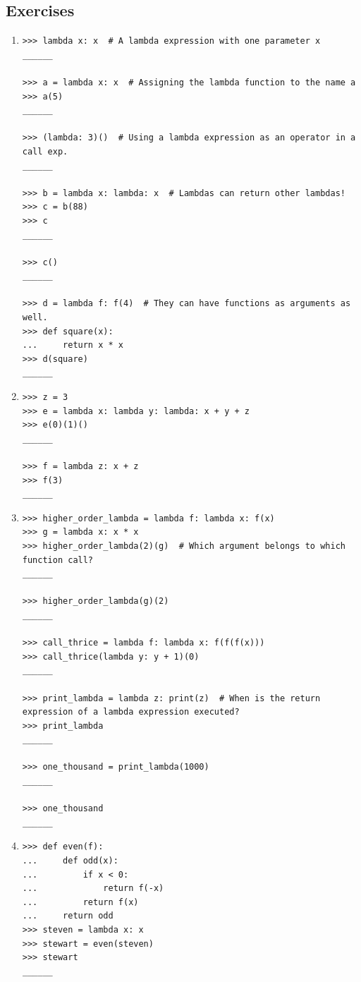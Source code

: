 \documentclass[11pt]{article}
\begin{document}
\subsection{Exercises}
\begin{enumerate}[leftmargin = *]
\item 
\begin{lstlisting}
>>> lambda x: x  # A lambda expression with one parameter x
______

>>> a = lambda x: x  # Assigning the lambda function to the name a
>>> a(5)
______

>>> (lambda: 3)()  # Using a lambda expression as an operator in a call exp.
______

>>> b = lambda x: lambda: x  # Lambdas can return other lambdas!
>>> c = b(88)
>>> c
______

>>> c()
______

>>> d = lambda f: f(4)  # They can have functions as arguments as well.
>>> def square(x):
...     return x * x
>>> d(square)
______
\end{lstlisting}
\newpage
\item 
\begin{lstlisting}
>>> z = 3
>>> e = lambda x: lambda y: lambda: x + y + z
>>> e(0)(1)()
______

>>> f = lambda z: x + z
>>> f(3)
______
\end{lstlisting}

\item 
\begin{lstlisting}
>>> higher_order_lambda = lambda f: lambda x: f(x)
>>> g = lambda x: x * x
>>> higher_order_lambda(2)(g)  # Which argument belongs to which function call?
______

>>> higher_order_lambda(g)(2)
______

>>> call_thrice = lambda f: lambda x: f(f(f(x)))
>>> call_thrice(lambda y: y + 1)(0)
______

>>> print_lambda = lambda z: print(z)  # When is the return expression of a lambda expression executed?
>>> print_lambda
______

>>> one_thousand = print_lambda(1000)
______

>>> one_thousand
______

\end{lstlisting}

\item
\begin{lstlisting}
>>> def even(f):
...     def odd(x):
...         if x < 0:
...             return f(-x)
...         return f(x)
...     return odd
>>> steven = lambda x: x
>>> stewart = even(steven)
>>> stewart
______


\end{lstlisting}
\end{enumerate}
\end{document}
